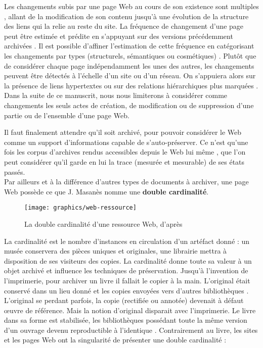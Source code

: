 \documentclass[symmetric,justified,marginals=raggedouter]{tufte-book}
\begin{document}
Les changements subis par une page Web au cours de son existence sont multiples \citep{douglis_at&t_1998, adar_web_2009}, allant de la modification de son contenu jusqu'à une évolution de la structure des liens qui la relie au reste du site. La fréquence de changement d'une page peut être estimée et prédite en s'appuyant sur des versions précédemment archivées \citep{chawathe_meaningful_1997,khoury_efficient_2007}. Il est possible d'affiner l'estimation de cette fréquence en catégorisant les changements par types (structurels, sémantiques ou cosmétiques) \citep{yadav_change_2007}. Plutôt que de considérer chaque page indépendamment les unes des autres, les changements peuvent être détectés à l'échelle d'un site ou d'un réseau. On s'appuiera alors sur la présence de liens hypertextes \citep{liu_webcq-detecting_2000} ou sur des relations hiérarchiques plus marquées \citep{lim_automated_2001}. Dans la suite de ce manuscrit, nous nous limiterons à considérer comme changements les seuls actes de création, de modification ou de suppression d'une partie ou de l'ensemble d'une page Web.

Il faut finalement attendre qu'il soit archivé, pour pouvoir considérer le Web comme un support d'informations capable de s'auto-préserver. Ce n'est qu'une fois les corpus d'archives rendus accessibles depuis le Web lui même \citep{brugger_website_2009}, que l'on peut considérer qu'il garde en lui la trace (mesurée et mesurable) de ses états passés.\\

\noindent Par ailleurs et à la différence d'autres types de documents à archiver, une page Web possède ce que J. Masanès \citep[p.47]{masanes_web_2006} nomme une \textbf{double cardinalité}. 

\begin{figure}
  \texttt{[image: graphics/web-ressource]}
  \caption{La double cardinalité d'une ressource Web, d'après \citep{masanes_web_2006}}
  \label{fig:web-ressource}
\end{figure} 

\noindent La cardinalité est le nombre d'instances en circulation d'un artéfact donné : un musée conservera des pièces uniques et originales, une librairie mettra à disposition de ses visiteurs des copies. La cardinalité donne toute sa valeur à un objet archivé et influence les techniques de préservation. Jusqu'à l'invention de l'imprimerie, pour archiver un livre il fallait le copier à la main. L'original était conservé dans un lieu donné et les copies envoyées vers d'autres bibliothèques \citep{canfora_vanished_1990}. L'original se perdant parfois, la copie (rectifiée ou annotée) devenait à défaut œuvre de référence. Mais la notion d'original disparait avec l'imprimerie. Le livre dans sa forme est stabilisée, les bibliothèques possédant toute la même version d'un ouvrage devenu reproductible à l'identique \citep{febvre_apparition_2013}. Contrairement au livre, les sites et les pages Web ont la singularité de présenter une double cardinalité : 
\end{document}
